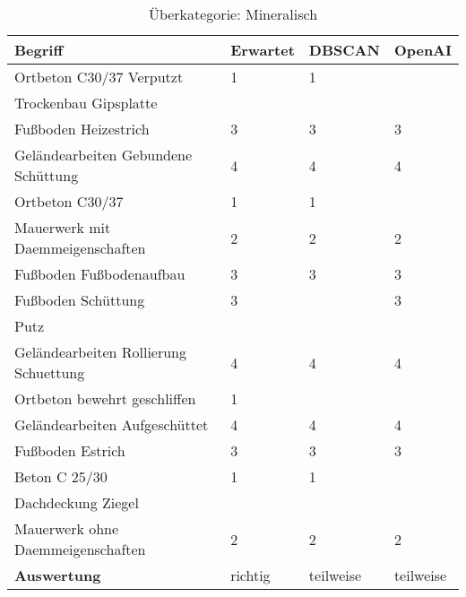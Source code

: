 \begin{table}[h]

	\centering
\begin{tabular}{|l|l|l|l|}
	\hline
	\textbf{Begriff} & \textbf{Erwartet} & \textbf{DBSCAN} & \textbf{OpenAI}\\ \hline
   Ortbeton C30/37 Verputzt & 1 & 1 & ~ \\ \hline
Trockenbau Gipsplatte & ~ & ~ & ~ \\ \hline
Fußboden Heizestrich & 3 & 3 & 3 \\ \hline
Geländearbeiten Gebundene Schüttung & 4 & 4 & 4 \\ \hline
Ortbeton C30/37 & 1 & 1 & ~ \\ \hline
Mauerwerk mit Daemmeigenschaften & 2 & 2 & 2 \\ \hline
Fußboden Fußbodenaufbau & 3 & 3 & 3 \\ \hline
Fußboden Schüttung & 3 & ~ & 3 \\ \hline
Putz & ~ & ~ & ~ \\ \hline
Geländearbeiten Rollierung Schuettung & 4 & 4 & 4 \\ \hline
Ortbeton bewehrt geschliffen & 1 & ~ & ~ \\ \hline
Geländearbeiten Aufgeschüttet & 4 & 4 & 4 \\ \hline
Fußboden Estrich & 3 & 3 & 3 \\ \hline
Beton C 25/30 & 1 & 1 & ~ \\ \hline
Dachdeckung Ziegel & ~ & ~ & ~ \\ \hline
Mauerwerk ohne Daemmeigenschaften & 2 & 2 & 2 \\ \hline
\textbf{Auswertung} & richtig & teilweise & teilweise \\ \hline
	\end{tabular}
	\caption{Überkategorie: Mineralisch}
	\label{t:evaluation-example1}
\end{table}

